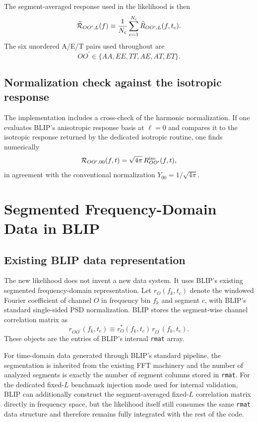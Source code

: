 \documentclass[11pt]{article}
\newcommand{\Nc}{N_{\rm c}}
\newcommand{\Rlm}{\mathcal{R}}
\newcommand{\Rsp}{\widetilde{\mathcal{R}}}
\newcommand{\OO}{OO^\prime}
\begin{document}
The segment-averaged response used in the likelihood is then
\begin{equation}
  \Rsp_{\OO,L}(f)
  \equiv
  \frac{1}{\Nc}\sum_{c=1}^{\Nc}\widehat{R}_{\OO,L}(f,t_c).
  \label{eq:implemented-fixedL-response-average}
\end{equation}
The six unordered A/E/T pairs used throughout are
\begin{equation}
  \OO \in \{AA,EE,TT,AE,AT,ET\}.
\end{equation}

\subsection{Normalization check against the isotropic response}

The implementation includes a cross-check of the harmonic normalization.  If one evaluates BLIP's anisotropic response basis at $\ell=0$ and compares it to the isotropic response returned by the dedicated isotropic routine, one finds numerically
\begin{equation}
  \Rlm_{\OO,00}(f,t)
  =
  \sqrt{4\pi}\,
  R^{\rm iso}_{\OO}(f,t),
  \label{eq:response-normalization-check}
\end{equation}
in agreement with the conventional normalization $Y_{00}=1/\sqrt{4\pi}$.

\section{Segmented Frequency-Domain Data in BLIP}

\subsection{Existing BLIP data representation}

The new likelihood does not invent a new data system.  It uses BLIP's existing segmented frequency-domain representation.  Let $r_O(f_k,t_c)$ denote the windowed Fourier coefficient of channel $O$ in frequency bin $f_k$ and segment $c$, with BLIP's standard single-sided PSD normalization.  BLIP stores the segment-wise channel correlation matrix as
\begin{equation}
  r_{OO^\prime}(f_k,t_c)
  \equiv
  r_O^\ast(f_k,t_c)\,r_{O^\prime}(f_k,t_c).
  \label{eq:rmat-definition}
\end{equation}
These objects are the entries of BLIP's internal \texttt{rmat} array.

For time-domain data generated through BLIP's standard pipeline, the segmentation is inherited from the existing FFT machinery and the number of analyzed segments is exactly the number of segment columns stored in \texttt{rmat}.  For the dedicated fixed-$L$ benchmark injection mode used for internal validation, BLIP can additionally construct the segment-averaged fixed-$L$ correlation matrix directly in frequency space, but the likelihood itself still consumes the same \texttt{rmat} data structure and therefore remains fully integrated with the rest of the code.
\end{document}
